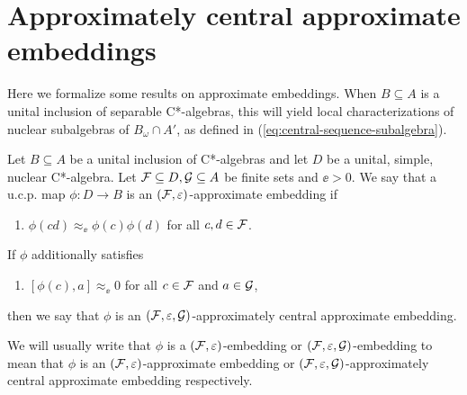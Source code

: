 \documentclass[12pt]{amsart}
\begin{document}
\section{Approximately central approximate embeddings}\label{section:dse-localembeddings}

  Here we formalize some results on approximate embeddings. When $B \subseteq A$ is a unital inclusion of separable C*-algebras, this will yield local characterizations of nuclear subalgebras of $B_\omega \cap A'$, as defined in (\ref{eq:central-sequence-subalgebra}).

    \begin{defn}
      Let $B \subseteq A$ be a unital inclusion of C*-algebras and let $D$ be a unital, simple, nuclear C*-algebra. Let $\mathcal{F} \subseteq D, \mathcal{G} \subseteq A$ be finite sets and $\ee > 0$. We say that a u.c.p. map $\phi: D \to B$ is an $(\mathcal{F},\varepsilon)$-approximate embedding if
        \begin{enumerate}
          \item $\phi(cd) \approx_\ee \phi(c)\phi(d)$ for all $c,d \in \mathcal{F}$.
        \end{enumerate}
        If $\phi$ additionally satisfies
          \begin{enumerate}
            \item[2.] $[\phi(c),a] \approx_\ee 0$ for all $c \in \mathcal{F}$ and $a \in \mathcal{G}$,
          \end{enumerate}
          then we say that $\phi$ is an $(\mathcal{F},\varepsilon,\mathcal{G})$-approximately central approximate embedding. 
    \end{defn}

    We will usually write that $\phi$ is a $(\mathcal{F},\varepsilon)$-embedding or $(\mathcal{F},\varepsilon,\mathcal{G})$-embedding to mean that $\phi$ is an $(\mathcal{F},\varepsilon)$-approximate embedding or $(\mathcal{F},\varepsilon,\mathcal{G})$-approximately central approximate embedding respectively. 
\end{document}
